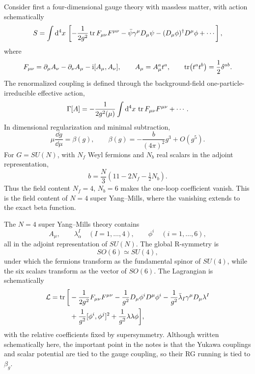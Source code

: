 Consider first a four-dimensional gauge theory with massless matter,
with action schematically
\[
  S=\int\mathrm{d}^4x\,
  \left[
    -\frac1{2g^2}\tr F_{\mu\nu}F^{\mu\nu}
    -\bar\psi\gamma^\mu D_\mu\psi
    -(D_\mu\phi)^\dagger D^\mu\phi+\cdots
  \right],
\]
where
\[
  F_{\mu\nu}=\partial_\mu A_\nu-\partial_\nu A_\mu-\mathrm{i}[A_\mu,A_\nu],
  \qquad
  A_\mu=A_\mu^a t^a,
  \qquad
  \tr(t^at^b)=\frac12\delta^{ab}.
\]
The renormalized coupling is defined through the background-field
one-particle-irreducible effective action,
\[
  \Gamma[A]
  =
  -\frac1{2g^2(\mu)}
  \int\mathrm{d}^4x\,\tr F_{\mu\nu}F^{\mu\nu}
  +\cdots .
\]
In dimensional regularization and minimal subtraction,
\[
  \mu\frac{\dd g}{\dd\mu}=\beta(g),
  \qquad
  \beta(g)=-\frac{b}{(4\pi)^2}g^3+O(g^5).
\]
For \(G=SU(N)\), with \(N_f\) Weyl fermions and \(N_b\) real scalars in
the adjoint representation,
\[
  b=\frac N3(11-2N_f-\tfrac12N_b).
\]
Thus the field content \(N_f=4\), \(N_b=6\) makes the one-loop
coefficient vanish.  This is the field content of \(N=4\) super
Yang--Mills, where the vanishing extends to the exact beta function.

The \(N=4\) super Yang--Mills theory contains
\[
  A_\mu,\qquad
  \lambda^I_\alpha\quad(I=1,\ldots,4),\qquad
  \phi^i\quad(i=1,\ldots,6),
\]
all in the adjoint representation of \(SU(N)\).  The global
R-symmetry is
\[
  SO(6)\simeq SU(4),
\]
under which the fermions transform as the fundamental spinor of
\(SU(4)\), while the six scalars transform as the vector of \(SO(6)\).
The Lagrangian is schematically
\[
\begin{aligned}
  \mathcal L
  =\tr\bigg[
    &-\frac1{2g^2}F_{\mu\nu}F^{\mu\nu}
    -\frac1{g^2}D_\mu\phi^iD^\mu\phi^i
    -\frac1{g^2}\bar\lambda_I\gamma^\mu D_\mu\lambda^I  \\
    &+\frac1{g^2}[\phi^i,\phi^j]^2
    +\frac1{g^2}\lambda\lambda\phi
  \bigg],
\end{aligned}
\]
with the relative coefficients fixed by supersymmetry.  Although written
schematically here, the important point in the notes is that the Yukawa
couplings and scalar potential are tied to the gauge coupling, so their
RG running is tied to \(\beta_g\).

